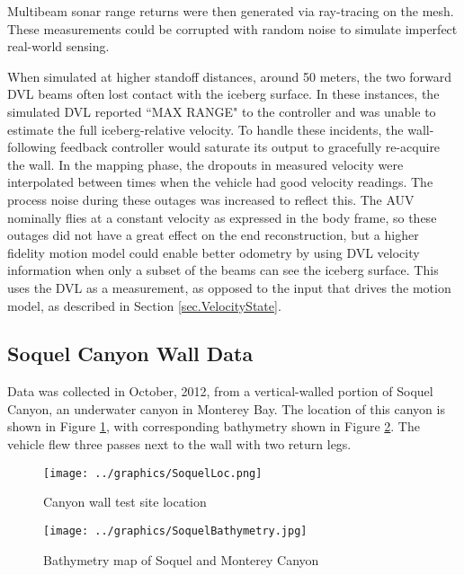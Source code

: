 Multibeam sonar range returns were then generated via ray-tracing on the mesh. These measurements could be corrupted with random noise to simulate imperfect real-world sensing. 

When simulated at higher standoff distances, around 50 meters, the two forward DVL beams often lost contact with the iceberg surface. In these instances, the simulated DVL reported ``MAX RANGE" to the controller and was unable to estimate the full iceberg-relative velocity. To handle these incidents, the wall-following feedback controller would saturate its output to gracefully re-acquire the wall. In the mapping phase, the dropouts in measured velocity were interpolated between times when the vehicle had good velocity readings. The process noise during these outages was increased to reflect this. The AUV nominally flies at a constant velocity as expressed in the body frame, so these outages did not have a great effect on the end reconstruction, but a higher fidelity motion model could enable better odometry by using DVL velocity information when only a subset of the beams can see the iceberg surface. This uses the DVL as a measurement, as opposed to the input that drives the motion model, as described in Section \ref{sec.VelocityState}.

\subsection{Soquel Canyon Wall Data}

Data was collected in October, 2012, from a vertical-walled portion of Soquel Canyon, an underwater canyon in Monterey Bay. The location of this canyon is shown in Figure \ref{fig:SoquelLoc}, with corresponding bathymetry shown in Figure \ref{fig:SoquelBathy}. The vehicle flew three passes next to the wall with two return legs.

 \begin{figure}[!htb]
   \centering
   \texttt{[image: ../graphics/SoquelLoc.png]} %
   \caption{Canyon wall test site location}
   \label{fig:SoquelLoc}
\end{figure}

 \begin{figure}[!htb]
   \centering
   \texttt{[image: ../graphics/SoquelBathymetry.jpg]} %
   \caption{Bathymetry map of Soquel and Monterey Canyon}
   \label{fig:SoquelBathy}
\end{figure}

